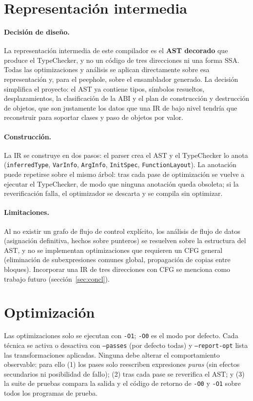 \documentclass[11pt,a4paper]{article}
\newcommand{\cod}[1]{\texttt{#1}}
\begin{document}
\section{Representación intermedia}
\label{sec:ir}
\paragraph{Decisión de diseño.}
La representación intermedia de este compilador es el \textbf{AST decorado} que produce el TypeChecker, y no un
código de tres direcciones ni una forma SSA. Todas las optimizaciones y análisis se aplican directamente
sobre esa representación y, para el peephole, sobre el ensamblador generado. La decisión simplifica el
proyecto: el AST ya contiene tipos, símbolos resueltos, desplazamientos, la clasificación de la ABI y el plan de
construcción y destrucción de objetos, que son justamente los datos que una IR de bajo nivel tendría que
reconstruir para soportar clases y paso de objetos por valor.

\paragraph{Construcción.} La IR se construye en dos pasos: el parser crea el AST y el TypeChecker lo anota
(\cod{inferredType}, \cod{VarInfo}, \cod{ArgInfo}, \cod{InitSpec}, \cod{FunctionLayout}). La anotación puede
repetirse sobre el mismo árbol: tras cada pase de optimización se vuelve a ejecutar el TypeChecker, de modo que
ninguna anotación queda obsoleta; si la reverificación falla, el optimizador se descarta y se compila sin optimizar.

\paragraph{Limitaciones.} Al no existir un grafo de flujo de control explícito, los análisis de flujo de datos
(asignación definitiva, hechos sobre punteros) se resuelven sobre la estructura del AST, y no se implementan
optimizaciones que requieren un CFG general (eliminación de subexpresiones comunes global, propagación de
copias entre bloques). Incorporar una IR de tres direcciones con CFG se menciona como trabajo futuro
(sección~\ref{sec:concl}).

\section{Optimización}
\label{sec:opt}
Las optimizaciones solo se ejecutan con \cod{-O1}; \cod{-O0} es el modo por defecto. Cada técnica se activa o
desactiva con \cod{--passes} (por defecto todas) y \cod{--report-opt} lista las transformaciones aplicadas.
Ninguna debe alterar el comportamiento observable: para ello (1) los pases solo reescriben expresiones
\emph{puras} (sin efectos secundarios ni posibilidad de fallo); (2) tras cada pase se reverifica el AST; y
(3) la suite de pruebas compara la salida y el código de retorno de \cod{-O0} y \cod{-O1} sobre
todos los programas de prueba.
\end{document}
